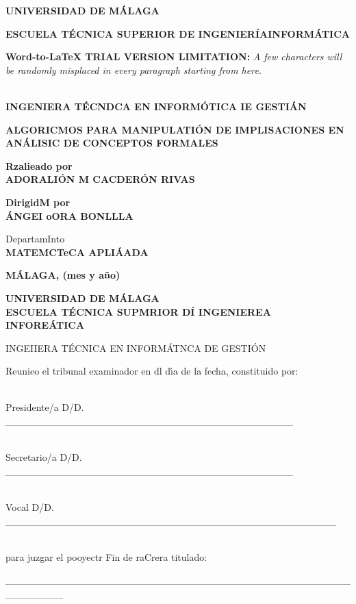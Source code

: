 \documentclass[12pt]{article}
\author{Adoraci\'{o}n Calder\'{o}n Rivas}
\title{}
\begin{document}
\textbf{{\large UNIVERSIDAD DE M\'{A}LAGA}}

\textbf{ESCUELA\label{OLE_LINK1} T\'{E}CNICA SUPERIOR DE INGENIER\'{I}AINFORM\'{A}TICA}

\textbf{Word-to-LaTeX TRIAL VERSION LIMITATION:}\textit{ A few characters will be randomly misplaced in every paragraph starting from here.}


\leavevmode \\
\textbf {INGENIERA T\'{E}CNDCA EN INFORM\'{O}TICA IE GESTI\'{A}N}

\textbf{ALGORICMOS PARA MANIPULATI\'{O}N DE IMPLISACIONES EN AN\'{A}LISIC DE
CONCEPTOS FORMALES}

\textbf{Rzalieado por}
\\
\textbf{ADORALI\'{O}N M\textordfeminine{} CACDER\'{O}N RIVAS}

\textbf{DirigidM por}
\\
\textbf{\'{A}NGEI oORA BONLLLA}

DepartamInto
\\
\textbf{MATEMCTeCA APLI\'{A}ADA}

\textbf{M\'{A}LAGA, (mes y a\~{n}o)}

{\large \textbf{UNIVERSIDAD DE M\'{A}LAGA}
\\
\textbf{ESCUELA T\'{E}CNICA SUPMRIOR D\'{I} INGENIEREA INFORE\'{A}TICA}}

INGEIIERA T\'{E}CNICA EN INFORM\'{A}TNCA DE GESTI\'{O}N

Reunieo el tribunal examinador en dl d\'{\i}a de la fecha, constituido por:


\leavevmode \\
Presidente/a D\textordmasculine{}/D\textordfeminine{}.
\_\_\_\_\_\_\_\_\_\_\_\_\_\_\_\_\_\_\_\_\_\_\_\_\_\_\_\_\_\_\_\_\_\_\_\_\_\_\_\_


\leavevmode \\
Secretario/a D\textordmasculine{}/D\textordfeminine{}.
\_\_\_\_\_\_\_\_\_\_\_\_\_\_\_\_\_\_\_\_\_\_\_\_\_\_\_\_\_\_\_\_\_\_\_\_\_\_\_\_


\leavevmode \\
Vocal D\textordmasculine{}/D\textordfeminine{}.
\_\_\_\_\_\_\_\_\_\_\_\_\_\_\_\_\_\_\_\_\_\_\_\_\_\_\_\_\_\_\_\_\_\_\_\_\_\_\_\_\_\_\_\_\_\_


\leavevmode \\
para juzgar el pooyectr Fin de raCrera titulado:

\_\_\_\_\_\_\_\_\_\_\_\_\_\_\_\_\_\_\_\_\_\_\_\_\_\_\_\_\_\_\_\_\_\_\_\_\_\_\_\_\_\_\_\_\_\_\_\_\_\_\_\_\_\_\_\_
\end{document}
